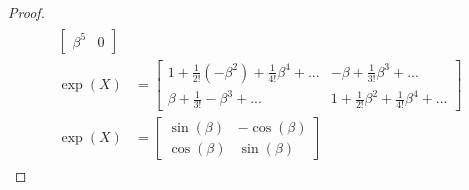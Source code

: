\documentclass[10pt]{article}
\begin{document}
\begin{proof}
\begin{align*}
\begin{split}
\begin{bmatrix}
        \beta^{5} & 0 
        \end{bmatrix} \\
        \exp(X) &= 
        \begin{bmatrix}
        1 + \frac{1}{2!}(-\beta^{2}) + \frac{1}{4!}\beta^{4} + ... & -\beta + \frac{1}{3!}\beta^{3} + ...\\
        \beta + \frac{1}{3!}-\beta^{3} + ... & 1 + \frac{1}{2!}\beta^{2} + \frac{1}{4!}\beta^{4} + ...
        \end{bmatrix} \\
        \exp(X) &=
        \begin{bmatrix}
        \sin(\beta) & -\cos(\beta)\\
        \cos(\beta) & \sin(\beta)
        \end{bmatrix}
     \end{split}
\end{align*}
\end{proof}
\pagebreak
\end{document}
